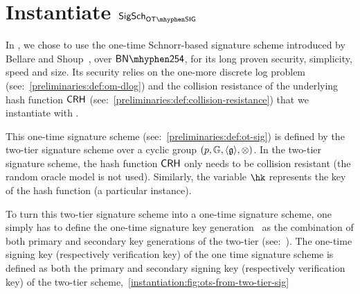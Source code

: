 
\section{Instantiate $\sigscheme_{\otsig}$}\label{instantiation:otsig}

In \zeth, we chose to use the one-time Schnorr-based signature scheme introduced by Bellare and Shoup~\cite{bellare2007two}, over $\BNCurve$, for its long proven security, simplicity, speed and size. Its security relies on the one-more discrete log problem (see:~\cref{preliminaries:def:om-dlog}) and the collision resistance of the underlying hash function $\mathsf{CRH}$ (see:~\cref{preliminaries:def:collision-resistance}) that we instantiate with .

This one-time signature scheme (see:~\cref{preliminaries:def:ot-sig}) is defined by the two-tier signature scheme over a cyclic group $(p, \mathbb{G}, \langle \mathfrak{g} \rangle, \otimes)$.
In the two-tier signature scheme, the hash function $\mathsf{CRH}$ only needs to be collision resistant (the random oracle model is not used). Similarly, the variable $\hk$ represents the key of the hash function (a particular instance).

To turn this two-tier signature scheme into a one-time signature scheme, one simply has to define the one-time signature key generation \kgen~as the combination of both primary and secondary key generations of the two-tier (see:~\cite[Section 6]{bellare2007two}). The one-time signing key (respectively verification key) of the one time signature scheme is defined as both the primary and secondary signing key (respectively verification key) of the two-tier scheme,~\cref{instantiation:fig:ots-from-two-tier-sig}

